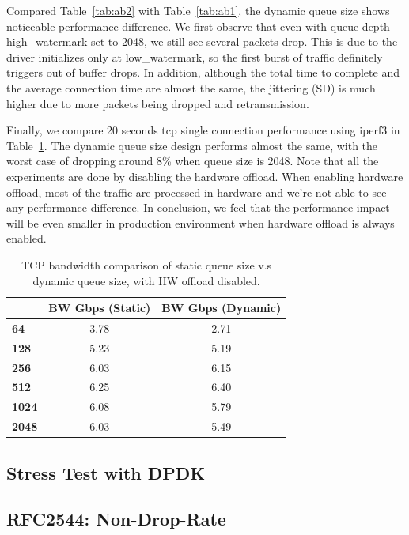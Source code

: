 \documentclass[letterpaper]{article}
\begin{document}
Compared Table~\ref{tab:ab2} with Table~\ref{tab:ab1}, the dynamic queue size shows noticeable
performance difference. We first observe that even with queue depth high\_watermark set to 2048,
we still see several packets drop. This is due to the driver initializes only at low\_watermark,
so the first burst of traffic definitely triggers out of buffer drops.
In addition, although the total time to complete and the average connection time are almost the
same, the jittering (SD) is much higher due to more packets being dropped and retransmission.

Finally, we compare 20 seconds tcp single connection performance using iperf3 in Table~\ref{tab:iperf}. 
The dynamic queue size design performs almost the same, with the worst case of
dropping around 8\% when queue size is 2048.
Note that all the experiments are done by disabling the hardware offload.
When enabling hardware offload, most of the traffic are processed in hardware and
we're not able to see any performance difference.
In conclusion, we feel that the performance impact will be even smaller in production
environment when hardware offload is always enabled.

\begin{table}[h!]
\centering
\footnotesize
\begin{tabular}{|l|c|c|}
\hline
\textbf{} & \textbf{BW Gbps (Static)} & \textbf{BW Gbps (Dynamic)} \\ \hline
\textbf{64}   & 3.78 & 2.71 \\ \hline
\textbf{128}  & 5.23 & 5.19 \\ \hline
\textbf{256}  & 6.03 & 6.15 \\ \hline
\textbf{512}  & 6.25 & 6.40  \\ \hline
\textbf{1024} & 6.08 & 5.79 \\ \hline
\textbf{2048} & 6.03 & 5.49 \\ \hline
\end{tabular}
\caption{TCP bandwidth comparison of static queue size v.s dynamic queue size, with HW offload disabled.}
\label{tab:iperf}
\end{table}

\subsection{Stress Test with DPDK}
\subsection{RFC2544: Non-Drop-Rate}
\end{document}
